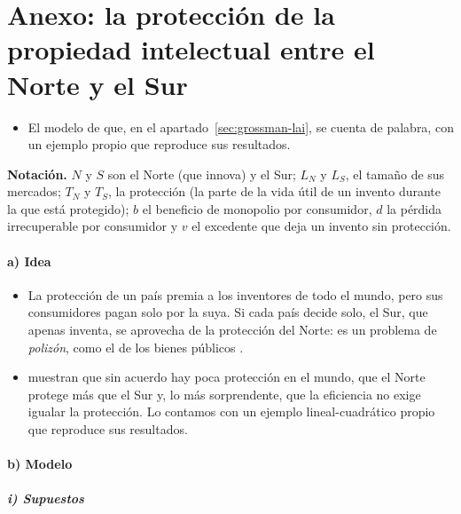 \documentclass[11pt]{article}
\begin{document}
\section{Anexo: la protección de la propiedad intelectual\cortetitulo{} entre el Norte y el Sur}\label{anexo:grossman-lai}

\begin{itemize}
\item El modelo de \textcite{GrossmanLai2004International} que, en el apartado~\ref{sec:grossman-lai}, se cuenta de palabra, con un ejemplo propio que reproduce sus resultados.
\end{itemize}

\begin{anotaciones}
\textbf{Notación.} $N$ y $S$ son el Norte (que innova) y el Sur; $L_N$ y $L_S$, el tamaño de sus mercados; $T_N$ y $T_S$, la protección (la parte de la vida útil de un invento durante la que está protegido); $b$ el beneficio de monopolio por consumidor, $d$ la pérdida irrecuperable por consumidor y $v$ el excedente que deja un invento sin protección.
\end{anotaciones}

\paragraph{a) Idea}

\begin{itemize}
\item La protección de un país premia a los inventores de todo el mundo, pero sus consumidores pagan solo por la suya. Si cada país decide solo, el Sur, que apenas inventa, se aprovecha de la protección del Norte: es un problema de \emph{polizón}, como el de los bienes públicos .
\item \textcite{GrossmanLai2004International} muestran que sin acuerdo hay poca protección en el mundo, que el Norte protege más que el Sur y, lo más sorprendente, que la eficiencia no exige igualar la protección. Lo contamos con un ejemplo lineal-cuadrático propio que reproduce sus resultados.
\end{itemize}

\paragraph{b) Modelo}

\subparagraph{i) Supuestos}
\end{document}
